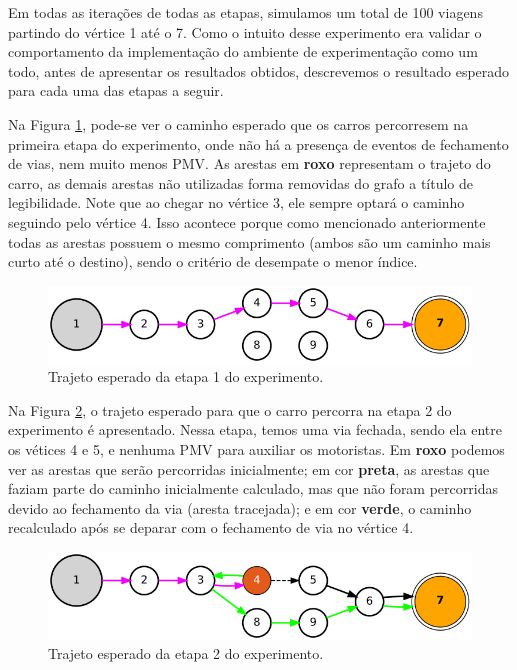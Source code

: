 Em todas as iterações de todas as etapas, simulamos um total de 100 viagens partindo do vértice 1 até o 7.
Como o intuito desse experimento era validar o comportamento da implementação do ambiente de experimentação como um todo, antes de apresentar os resultados obtidos, descrevemos o resultado esperado para
cada uma das etapas a seguir.

Na Figura \ref{fig:mapa_etapa1}, pode-se ver o caminho esperado que os carros percorresem na primeira etapa do experimento, onde não há a presença de eventos de fechamento de vias, nem muito menos PMV.
As arestas em \textbf{roxo} representam o trajeto do carro, as demais arestas não utilizadas forma removidas do grafo a título de legibilidade.
Note que ao chegar no vértice 3, ele sempre optará o caminho seguindo pelo vértice 4.
Isso acontece porque como mencionado anteriormente todas as arestas possuem o mesmo comprimento (ambos são um caminho mais curto até o destino), sendo o critério de desempate o menor índice.

\begin{figure}[ht]
	\centering
	\includegraphics[width=\textwidth]{figuras/mapa_etapa1.png}
	\caption{Trajeto esperado da etapa 1 do experimento.}
	\label{fig:mapa_etapa1}
\end{figure}

Na Figura \ref{fig:mapa_etapa2}, o trajeto esperado para que o carro percorra na etapa 2 do experimento é apresentado.
Nessa etapa, temos uma via fechada, sendo ela entre os vétices 4 e 5, e nenhuma PMV para auxiliar os motoristas.
Em \textbf{roxo} podemos ver as arestas que serão percorridas inicialmente;
em cor \textbf{preta}, as arestas que faziam parte do caminho inicialmente calculado, mas que não foram percorridas devido ao fechamento da via (aresta tracejada);
e em cor \textbf{verde}, o caminho recalculado após se deparar com o fechamento de via no vértice 4.

\begin{figure}[ht]
	\centering
	\includegraphics[width=\textwidth]{figuras/mapa_etapa2.png}
	\caption{Trajeto esperado da etapa 2 do experimento.}
	\label{fig:mapa_etapa2}
\end{figure}

